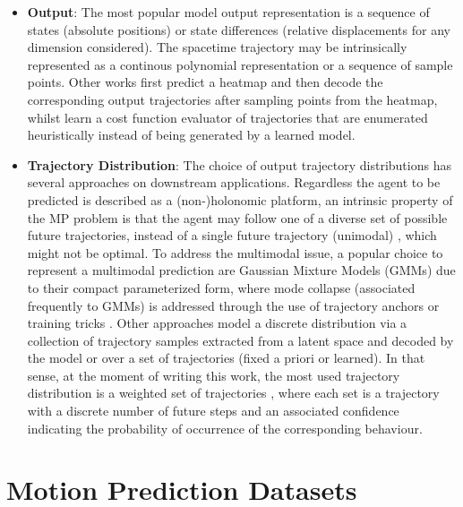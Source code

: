 \begin{itemize}
	\item \textbf{Output}: The most popular model output representation is a sequence of states (absolute positions) or state differences (relative displacements for any dimension considered). The spacetime trajectory may be intrinsically represented as a continous polynomial representation or a sequence of sample points. Other works \cite{gilles2021home} \cite{gilles2022gohome} first predict a heatmap and then decode the corresponding output trajectories after sampling points from the heatmap, whilst \cite{casas2021mp3} \cite{zeng2019end} learn a cost function evaluator of trajectories that are enumerated heuristically instead of being generated by a learned model. 
	
	\item \textbf{Trajectory Distribution}: The choice of output trajectory distributions has several approaches on downstream applications. Regardless the agent to be predicted is described as a (non-)holonomic \cite{triggs1993motion} platform, an intrinsic property of the \ac{MP} problem is that the agent may follow one of a diverse set of possible future trajectories, instead of a single future trajectory (unimodal) \cite{gao2020vectornet}, which might not be optimal. To address the multimodal issue, a popular choice to represent a multimodal prediction are Gaussian Mixture Models (GMMs) due to their compact parameterized form, where mode collapse (associated frequently to GMMs) is addressed through the use of trajectory anchors \cite{chai2019multipath} or training  tricks \cite{cui2019multimodal}. Other approaches model a discrete distribution via a collection of trajectory samples extracted from a latent space and decoded by the model \cite{rhinehart2018r2p2} or over a set of trajectories (fixed a priori or learned). In that sense, at the moment of writing this work, the most used trajectory distribution is a weighted set of trajectories \cite{liang2020learning, zhao2021tnt, schmidt2022crat}, where each set is a trajectory with a discrete number of future steps and an associated confidence indicating the probability of occurrence of the corresponding behaviour.
	
\end{itemize}

\section{Motion Prediction Datasets}
\label{sec:2_motion_prediction_datasets}

